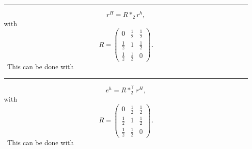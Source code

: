 \begin{enumerate}
\hrule

\begin{equation}
r^{H} = R \ast_2 r^h,
\end{equation}
with 
\begin{equation}
\label{linear-restrict}
R=
\begin{pmatrix}
0 &\frac{1}{2}&\frac{1}{2}\\
\frac{1}{2}& 1&\frac{1}{2}\\
\frac{1}{2}&\frac{1}{2}&  0
\end{pmatrix}.
\end{equation}
\
This can be done with


%
\hrule



\begin{equation}
e^{h} =  R \ast_2^\top r^H,
\end{equation}
with 
\begin{equation}
\label{linear-restrict}
R=
\begin{pmatrix}
0 &\frac{1}{2}&\frac{1}{2}\\
\frac{1}{2}& 1&\frac{1}{2}\\
\frac{1}{2}&\frac{1}{2}&  0
\end{pmatrix}.
\end{equation}
\
This can be done with 




\end{enumerate}
